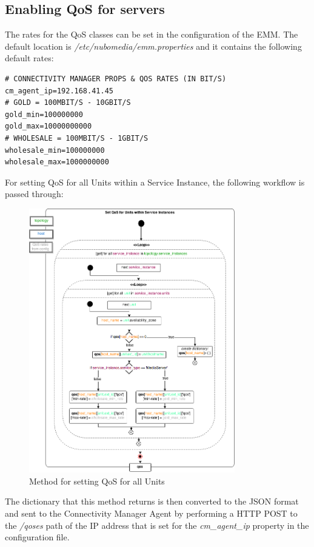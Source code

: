 \subsection{Enabling QoS for servers}

The rates for the QoS classes can be set in the configuration of the EMM.
The default location is \textit{/etc/nubomedia/emm.properties} and it contains the following default rates:
\begin{lstlisting}[language=commands]
# CONNECTIVITY MANAGER PROPS & QOS RATES (IN BIT/S)
cm_agent_ip=192.168.41.45
# GOLD = 100MBIT/S - 10GBIT/S
gold_min=100000000
gold_max=10000000000
# WHOLESALE = 100MBIT/S - 1GBIT/S
wholesale_min=100000000
wholesale_max=1000000000
\end{lstlisting}

For setting QoS for all Units within a Service Instance, the following workflow is passed through:

\begin{figure}[H]
\centering

\includegraphics[width=0.8\textwidth]{images/implementation/cm_set_qos.png}

\caption{Method for setting QoS for all Units}
\end{figure}

The dictionary that this method returns is then converted to the JSON format and sent to the Connectivity Manager Agent by performing a HTTP POST to the \textit{/qoses} path of the IP address that is set for the \textit{cm\_agent\_ip} property in the configuration file.
\newpage
